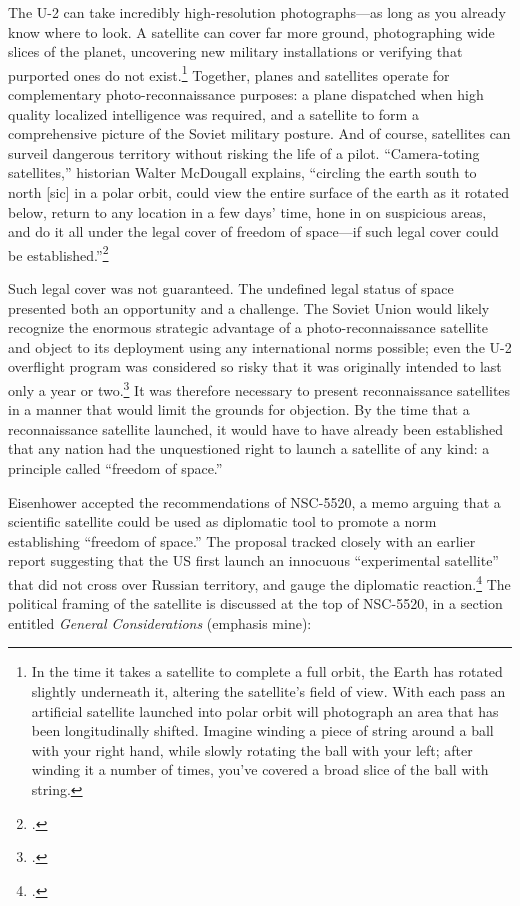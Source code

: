 \documentclass[14pt]{extarticle}
\begin{document}
The U-2 can take incredibly high-resolution photographs---as long as you already know where to look. A satellite can cover far more ground, photographing wide slices of the planet, uncovering new military installations or verifying that purported ones do not exist.\footnote{In the time it takes a satellite to complete a full orbit, the Earth has rotated slightly underneath it, altering the satellite's field of view. With each pass an artificial satellite launched into polar orbit will photograph an area that has been longitudinally shifted. Imagine winding a piece of string around a ball with your right hand, while slowly rotating the ball with your left; after winding it a number of times, you've covered a broad slice of the ball with string.} Together, planes and satellites operate for complementary photo-reconnaissance purposes: a plane dispatched when high quality localized intelligence was required, and a satellite to form a comprehensive picture of the Soviet military posture. And of course, satellites can surveil dangerous territory without risking the life of a pilot. \enquote{Camera-toting satellites,} historian Walter McDougall explains, \enquote{circling the earth south to north [sic] in a polar orbit, could view the entire surface of the earth as it rotated below, return to any location in a few days' time, hone in on suspicious areas, and do it all under the legal cover of freedom of space---if such legal cover could be established.}\footcite[p.~117]{mcdougall_heavens_1985}

Such legal cover was not guaranteed. The undefined legal status of space presented both an opportunity and a challenge. The Soviet Union would likely recognize the enormous strategic advantage of a photo-reconnaissance satellite and object to its deployment using any international norms possible; even the U-2 overflight program was considered so risky that it was originally intended to last only a year or two.\footcite[p.~33]{lindgren_trust_2000} It was therefore necessary to present reconnaissance satellites in a manner that would limit the grounds for objection. By the time that a reconnaissance satellite launched, it would have to have already been established that any nation had the unquestioned right to launch a satellite of any kind: a principle called \enquote{freedom of space.}

Eisenhower accepted the recommendations of NSC-5520, a memo arguing that a scientific satellite could be used as diplomatic tool to promote a norm establishing ``freedom of space.'' The proposal tracked closely with an earlier report suggesting that the US first launch an innocuous ``experimental satellite'' that did not cross over Russian territory, and gauge the diplomatic reaction.\footcite[p.~21]{kecskemetic_satellite_1950} The political framing of the satellite is discussed at the top of NSC-5520, in a section entitled \emph{General Considerations} (emphasis mine):
\newline
\end{document}
